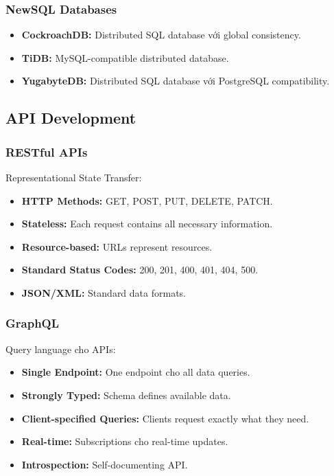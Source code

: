 \documentclass[a4paper,12pt]{report}
\begin{document}
\subsubsection{NewSQL Databases}
\begin{itemize}
    \item \textbf{CockroachDB:} Distributed SQL database với global consistency.
    \item \textbf{TiDB:} MySQL-compatible distributed database.
    \item \textbf{YugabyteDB:} Distributed SQL database với PostgreSQL compatibility.
\end{itemize}

\subsection{API Development}

\subsubsection{RESTful APIs}
Representational State Transfer:
\begin{itemize}
    \item \textbf{HTTP Methods:} GET, POST, PUT, DELETE, PATCH.
    \item \textbf{Stateless:} Each request contains all necessary information.
    \item \textbf{Resource-based:} URLs represent resources.
    \item \textbf{Standard Status Codes:} 200, 201, 400, 401, 404, 500.
    \item \textbf{JSON/XML:} Standard data formats.
\end{itemize}

\subsubsection{GraphQL}
Query language cho APIs:
\begin{itemize}
    \item \textbf{Single Endpoint:} One endpoint cho all data queries.
    \item \textbf{Strongly Typed:} Schema defines available data.
    \item \textbf{Client-specified Queries:} Clients request exactly what they need.
    \item \textbf{Real-time:} Subscriptions cho real-time updates.
    \item \textbf{Introspection:} Self-documenting API.
\end{itemize}
\end{document}
